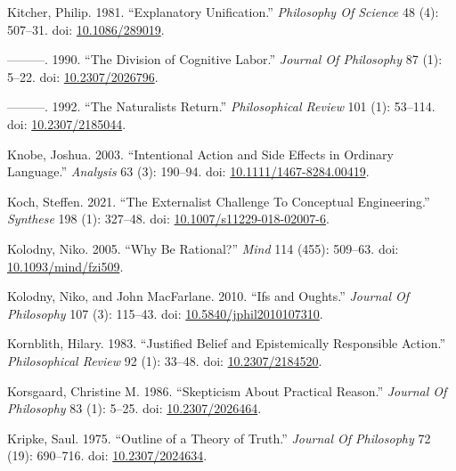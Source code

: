 \documentclass[
  10pt,
  letterpaper,
  DIV=11,
  numbers=noendperiod,
  twoside]{scrartcl}
\newlength{\cslhangindent}
\newenvironment{CSLReferences}[2] %
 {\begin{list}{}{%
  \setlength{\itemindent}{0pt}
  \setlength{\leftmargin}{0pt}
  \setlength{\parsep}{0pt}
  \ifodd #1
   \setlength{\leftmargin}{\cslhangindent}
   \setlength{\itemindent}{-1\cslhangindent}
  \fi
  \setlength{\itemsep}{#2\baselineskip}}}
 {\end{list}}
\begin{document}
\begin{CSLReferences}{1}{0}
Kitcher, Philip. 1981. {``Explanatory Unification.''} \emph{Philosophy
Of Science} 48 (4): 507--31. doi:
\href{https://doi.org/10.1086/289019}{10.1086/289019}.

---------. 1990. {``The Division of Cognitive Labor.''} \emph{Journal Of
Philosophy} 87 (1): 5--22. doi:
\href{https://doi.org/10.2307/2026796}{10.2307/2026796}.

---------. 1992. {``The Naturalists Return.''} \emph{Philosophical
Review} 101 (1): 53--114. doi:
\href{https://doi.org/10.2307/2185044}{10.2307/2185044}.

Knobe, Joshua. 2003. {``Intentional Action and Side Effects in Ordinary
Language.''} \emph{Analysis} 63 (3): 190--94. doi:
\href{https://doi.org/10.1111/1467-8284.00419}{10.1111/1467-8284.00419}.

Koch, Steffen. 2021. {``The Externalist Challenge To Conceptual
Engineering.''} \emph{Synthese} 198 (1): 327--48. doi:
\href{https://doi.org/10.1007/s11229-018-02007-6}{10.1007/s11229-018-02007-6}.

Kolodny, Niko. 2005. {``Why Be Rational?''} \emph{Mind} 114 (455):
509--63. doi:
\href{https://doi.org/10.1093/mind/fzi509}{10.1093/mind/fzi509}.

Kolodny, Niko, and John MacFarlane. 2010. {``Ifs and Oughts.''}
\emph{Journal Of Philosophy} 107 (3): 115--43. doi:
\href{https://doi.org/10.5840/jphil2010107310}{10.5840/jphil2010107310}.

Kornblith, Hilary. 1983. {``Justified Belief and Epistemically
Responsible Action.''} \emph{Philosophical Review} 92 (1): 33--48. doi:
\href{https://doi.org/10.2307/2184520}{10.2307/2184520}.

Korsgaard, Christine M. 1986. {``Skepticism About Practical Reason.''}
\emph{Journal Of Philosophy} 83 (1): 5--25. doi:
\href{https://doi.org/10.2307/2026464}{10.2307/2026464}.

Kripke, Saul. 1975. {``Outline of a Theory of Truth.''} \emph{Journal Of
Philosophy} 72 (19): 690--716. doi:
\href{https://doi.org/10.2307/2024634}{10.2307/2024634}.


\end{CSLReferences}
\end{document}
